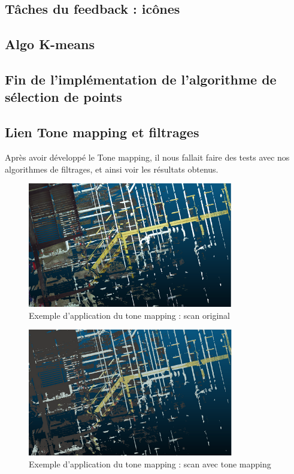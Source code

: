 \documentclass[12pt,titlepage,french]{article}
\begin{document}
\subsection{Tâches du feedback : icônes}

\subsection{Algo K-means}

\subsection{Fin de l'implémentation de l'algorithme de sélection de points}

\subsection{Lien Tone mapping et filtrages}
Après avoir développé le Tone mapping, il nous fallait faire des tests avec nos algorithmes de filtrages, et ainsi voir les résultats obtenus.

\begin{figure}[H]
 \caption{\label{}  Exemple d'application du tone mapping : scan original}
 \begin{center}
 \includegraphics[width=0.8\textwidth]{./img/tm_example_1.PNG}
  \end{center}
\end{figure}

\begin{figure}[H]
 \caption{\label{}  Exemple d'application du tone mapping : scan avec tone mapping}
 \begin{center}
 \includegraphics[width=0.8\textwidth]{./img/tm_example_2.PNG}
  \end{center}
\end{figure}
\end{document}
